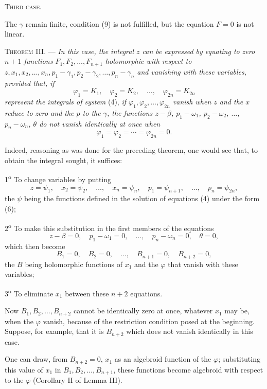 \documentclass[11pt]{article}
\begin{document}
\begin{center}
\textsc{Third case.}
\end{center}

The $\gamma$ remain finite, condition (9) is not fulfilled, but the equation $F=0$ is not linear.

\medskip
\noindent\textsc{Theorem III.} — \emph{In this case, the integral $z$ can be expressed by equating to zero $n+1$ functions $F_1,F_2,\ldots,F_{n+1}$ holomorphic with respect to $z,x_1,x_2,\ldots,x_n,p_1-\gamma_1,p_2-\gamma_2,\ldots,p_n-\gamma_n$ and vanishing with these variables, provided that, if}
\[
\varphi_1=K_1,\quad \varphi_2=K_2,\quad \ldots,\quad \varphi_{2n}=K_{2n}
\]
\emph{represent the integrals of system} (4), \emph{if $\varphi_1,\varphi_2,\ldots,\varphi_{2n}$ vanish when $z$ and the $x$ reduce to zero and the $p$ to the $\gamma$, the functions $z-\beta$, $p_1-\omega_1$, $p_2-\omega_2$, $\ldots$, $p_n-\omega_n$, $\theta$ do not vanish identically at once when}
\[
\varphi_1=\varphi_2=\cdots=\varphi_{2n}=0.
\]

Indeed, reasoning as was done for the preceding theorem, one would see that, to obtain the integral sought, it suffices:

1\textsuperscript{o} To change variables by putting
\[
z=\psi_1,
\quad x_2=\psi_2,
\quad \ldots,
\quad x_n=\psi_n,
\quad p_1=\psi_{n+1},
\quad \ldots,
\quad p_n=\psi_{2n},
\]
the $\psi$ being the functions defined in the solution of equations (4) under the form (6);

2\textsuperscript{o} To make this substitution in the first members of the equations
\[
z-\beta=0,
\quad p_1-\omega_1=0,
\quad \ldots,
\quad p_n-\omega_n=0,
\quad \theta=0,
\]
which then become
\[
B_1=0,
\quad B_2=0,
\quad \ldots,
\quad B_{n+1}=0,
\quad B_{n+2}=0,
\]
the $B$ being holomorphic functions of $x_1$ and the $\varphi$ that vanish with these variables;

3\textsuperscript{o} To eliminate $x_1$ between these $n+2$ equations.

Now $B_1,B_2,\ldots,B_{n+2}$ cannot be identically zero at once, whatever $x_1$ may be, when the $\varphi$ vanish, because of the restriction condition posed at the beginning. Suppose, for example, that it is $B_{n+2}$ which does not vanish identically in this case.

One can draw, from $B_{n+2}=0$, $x_1$ as an algebroid function of the $\varphi$; substituting this value of $x_1$ in $B_1,B_2,\ldots,B_{n+1}$, these functions become algebroid with respect to the $\varphi$ (Corollary II of Lemma III).
\end{document}
